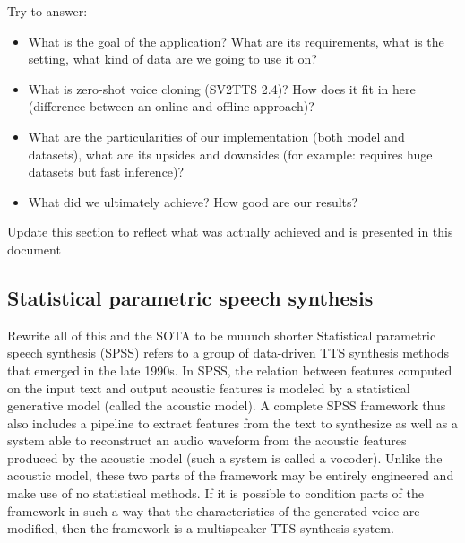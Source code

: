 \documentclass[a4paper, oneside]{article}
\begin{document}
Try to answer:
\begin{itemize}
	\item What is the goal of the application? What are its requirements, what is the setting, what kind of data are we going to use it on?
	\item What is zero-shot voice cloning (SV2TTS 2.4)? How does it fit in here (difference between an online and offline approach)?
	\item What are the particularities of our implementation (both model and datasets), what are its upsides and downsides (for example: requires huge datasets but fast inference)?
	\item What did we ultimately achieve? How good are our results?
\end{itemize}


\color{red} Update this section to reflect what was actually achieved and is presented in this document \color{black}



\subsection{Statistical parametric speech synthesis}
\color{red} Rewrite all of this and the SOTA to be muuuch shorter \color{black}
Statistical parametric speech synthesis (SPSS) refers to a group of data-driven TTS synthesis methods that emerged in the late 1990s. In SPSS, the relation between features computed on the input text and output acoustic features is modeled by a statistical generative model (called the acoustic model). A complete SPSS framework thus also includes a pipeline to extract features from the text to synthesize as well as a system able to reconstruct an audio waveform from the acoustic features produced by the acoustic model (such a system is called a vocoder). Unlike the acoustic model, these two parts of the framework may be entirely engineered and make use of no statistical methods. If it is possible to condition parts of the framework in such a way that the characteristics of the generated voice are modified, then the framework is a multispeaker TTS synthesis system.
\end{document}
